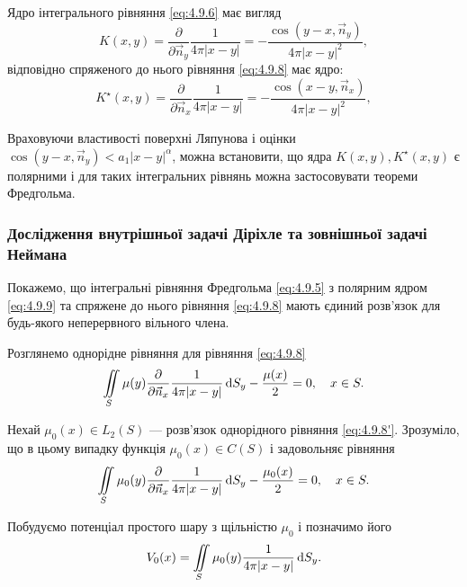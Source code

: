 Ядро інтегрального рівняння \eqref{eq:4.9.6} має вигляд
\begin{equation}
	\label{eq:4.9.9}
	K(x, y) = \frac{\partial}{\partial \vec n_y} \frac{1}{4 \pi |x - y|} = - \frac{\cos(y - x, \vec n_y)}{4 \pi |x - y|^2},
\end{equation}
відповідно спряженого до нього рівняння \eqref{eq:4.9.8} має ядро:
\begin{equation}
	\label{eq:4.9.10}
	K^\star(x, y) = \frac{\partial}{\partial \vec n_x} \frac{1}{4 \pi |x - y|} = - \frac{\cos(x - y, \vec n_x)}{4 \pi |x - y|^2},
\end{equation}

Враховуючи властивості поверхні Ляпунова і оцінки $\cos(y - x, \vec n_y) < a_1 |x - y|^\alpha$, можна встановити, що ядра $K(x, y), K^\star(x, y)$ є полярними і для таких інтегральних рівнянь можна застосовувати теореми Фредгольма.

\subsubsection{Дослідження внутрішньої задачі Діріхле та зовнішньої задачі Неймана}

Покажемо, що інтегральні рівняння Фредгольма \eqref{eq:4.9.5} з полярним ядром \eqref{eq:4.9.9} та спряжене до нього рівняння \eqref{eq:4.9.8} мають єдиний розв'язок для будь-якого неперервного вільного члена. \medskip

Розглянемо однорідне рівняння для рівняння \eqref{eq:4.9.8} 
\begin{equation}
	\label{eq:4.9.8'}
	\displaystyle\iint\limits_S \mu(y) \frac{\partial}{\partial \vec n_x} \frac{1}{4 \pi |x - y|} \mathop{}\!\mathrm{d} S_y - \frac{\mu(x)}{2} = 0, \quad x \in S.
\end{equation}

Нехай $\mu_0(x) \in L_2(S)$ ---  розв'язок однорідного рівняння \eqref{eq:4.9.8'}. Зрозуміло, що в цьому випадку функція $\mu_0(x) \in C(S)$ і задовольняє рівняння
\begin{equation}
	\label{eq:4.9.8''}
	\displaystyle\iint\limits_S \mu_0(y) \frac{\partial}{\partial \vec n_x} \frac{1}{4 \pi |x - y|} \mathop{}\!\mathrm{d} S_y - \frac{\mu_0(x)}{2} = 0, \quad x \in S.
\end{equation}

Побудуємо потенціал простого шару з щільністю $\mu_0$ і позначимо його
\begin{equation}
	\label{eq:4.9.11}	
	V_0(x) = \displaystyle\iint\limits_S \mu_0(y) \frac{1}{4 \pi |x - y|} \mathop{}\!\mathrm{d} S_y.
\end{equation}

